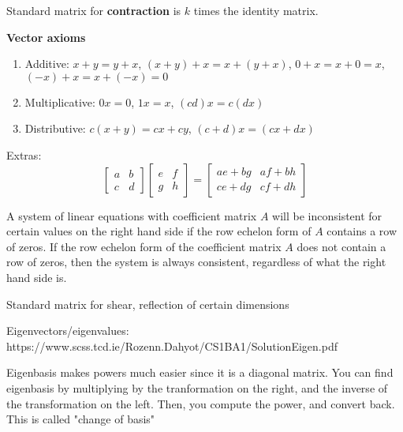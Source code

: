 \documentclass[11pt, letterpaper, twoside]{article}
\begin{document}
\vspace{2mm}
Standard matrix for \textbf{contraction} is \(k\) times the identity matrix.

\vspace{2mm}

\textbf{Vector axioms}
\begin{enumerate}[label=-]
\item Additive: \(x+y=y+x\), \((x+y)+x=x+(y+x)\), \(0+x=x+0=x\), \((-x)+x=x+(-x)=0\)
\item Multiplicative: \(0x=0\), \(1x=x\), \((cd)x=c(dx)\)
\item Distributive: \(c(x+y)=cx+cy\), \((c+d)x=(cx+dx)\)
\end{enumerate}
\vspace{2mm}
Extras:
\[\begin{bmatrix}
a&b\\
c&d
\end{bmatrix}\begin{bmatrix}
e&f\\
g&h
\end{bmatrix}=\begin{bmatrix}
ae+bg&af+bh\\
ce+dg&cf+dh
\end{bmatrix}\]

A system of linear equations with coefficient matrix \(A\) will be inconsistent for certain values on the right hand side if the row echelon form of \(A\) contains a row of zeros. If the row echelon form of the coefficient matrix \(A\) does not contain a row of zeros, then the system is always consistent, regardless of what the right hand side is.

Standard matrix for shear, reflection of certain dimensions

Eigenvectors/eigenvalues:
https://www.scss.tcd.ie/Rozenn.Dahyot/CS1BA1/SolutionEigen.pdf

Eigenbasis makes powers much easier since it is a diagonal matrix. 
You can find eigenbasis by multiplying by the tranformation on the right, and the 
inverse of the transformation on the left. 
Then, you compute the power, and convert back.
This is called "change of basis"
\end{document}
